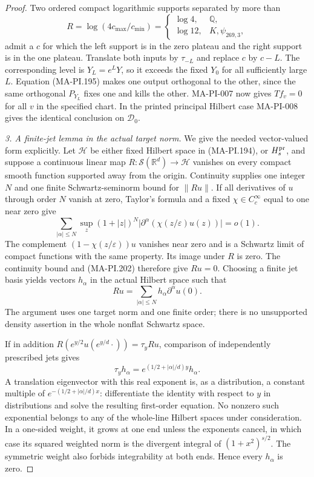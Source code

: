 \begin{proof}
Two ordered compact logarithmic supports separated by
more than
\[
 R=\log(4c_{\max}/c_{\min})
     =\begin{cases}\log4,&\mathbb Q,\\\log12,&K,\psi_{269,3},\end{cases}
 \tag{MA-PI.201}
\]
admit a $c$ for which the left support is in the zero
plateau and the right support is in the one plateau.
Translate both inputs by $\tau_{-L}$ and replace $c$
by $c-L$.  The corresponding level is $Y_L=e^LY$,
so it exceeds the fixed $Y_0$ for all sufficiently
large $L$.  Equation (MA-PI.195) makes one output
orthogonal to the other, since the same orthogonal
$P_{Y_L}$ fixes one and kills the other.
MA-PI-007 now gives $Tf_v=0$ for all $v$ in the
specified chart.  In the printed principal Hilbert case
MA-PI-008 gives the identical conclusion on $\mathcal D_0$.

\emph{3. A finite-jet lemma in the actual target norm.}
We give the needed vector-valued form explicitly.
Let $\mathscr H$ be either fixed Hilbert space in
(MA-PI.194), or $H_s^{\rm pr}$, and suppose a continuous
linear map $R:\mathcal S(\mathbb R^d)\to\mathscr H$
vanishes on every compact smooth function supported
away from the origin.  Continuity supplies one integer
$N$ and one finite Schwartz-seminorm bound for $\|Ru\|$.
If all derivatives of $u$ through order $N$ vanish at
zero, Taylor's formula and a fixed $\chi\in C_c^\infty$
equal
to one near zero give
\[
 \sum_{|\alpha|\le N}\sup_z
 (1+|z|)^N\bigl|\partial^\alpha
                    (\chi(z/\varepsilon)u(z))\bigr|=o(1).
 \tag{MA-PI.202}
\]
The complement $(1-\chi(z/\varepsilon))u$ vanishes
near zero and is a Schwartz limit of compact functions
with the same property.  Its image under $R$ is zero.
The continuity bound and (MA-PI.202) therefore give $Ru=0$.
Choosing a finite jet basis yields vectors $h_\alpha$
in the actual Hilbert space such that
\[
                   Ru=\sum_{|\alpha|\le N}
                                 h_\alpha\partial^\alpha u(0).
 \tag{MA-PI.203}
\]
The argument uses one target norm and one finite order;
there is no unsupported density assertion in the
whole nonflat Schwartz space.

If in addition
$R(e^{y/2}u(e^{y/d}\cdot))=\tau_yRu$, comparison of
independently prescribed jets gives
\[
 \tau_yh_\alpha=e^{(1/2+|\alpha|/d)y}h_\alpha.
 \tag{MA-PI.204}
\]
A translation eigenvector with this real exponent is,
as a distribution, a constant multiple of
$e^{-(1/2+|\alpha|/d)x}$: differentiate the identity
with respect to $y$ in distributions and solve the
resulting first-order equation.
No nonzero such exponential belongs to any of the
whole-line Hilbert spaces under consideration.
In a one-sided weight, it grows at one end unless the
exponents cancel, in which case its squared weighted
norm is the divergent integral of $(1+x^2)^{s/2}$.
The symmetric weight also forbids integrability at both
ends.  Hence every $h_\alpha$ is zero.


\end{proof}
